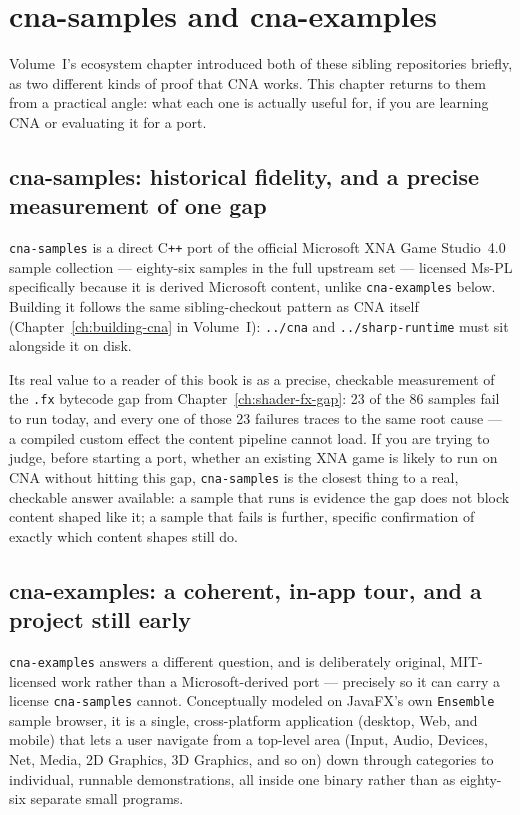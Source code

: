 \chapter{cna-samples and cna-examples}
\label{ch:samples-and-examples}

Volume~I's ecosystem chapter introduced both of these sibling repositories briefly, as two
different kinds of proof that CNA works. This chapter returns to them from a practical
angle: what each one is actually useful for, if you are learning CNA or evaluating it for a
port.

\section{cna-samples: historical fidelity, and a precise measurement of one gap}

\texttt{cna-samples} is a direct C\texttt{++} port of the official Microsoft XNA Game
Studio~4.0 sample collection --- eighty-six samples in the full upstream set --- licensed
Ms-PL specifically because it is derived Microsoft content, unlike \texttt{cna-examples}
below. Building it follows the same sibling-checkout pattern as CNA itself
(Chapter~\ref{ch:building-cna} in Volume~I): \texttt{../cna} and \texttt{../sharp-runtime}
must sit alongside it on disk.

Its real value to a reader of this book is as a precise, checkable measurement of the
\texttt{.fx} bytecode gap from Chapter~\ref{ch:shader-fx-gap}: 23 of the 86 samples fail to
run today, and every one of those 23 failures traces to the same root cause --- a compiled
custom effect the content pipeline cannot load. If you are trying to judge, before starting a
port, whether an existing XNA game is likely to run on CNA without hitting this gap,
\texttt{cna-samples} is the closest thing to a real, checkable answer available: a sample
that runs is evidence the gap does not block content shaped like it; a sample that fails is
further, specific confirmation of exactly which content shapes still do.

\section{cna-examples: a coherent, in-app tour, and a project still early}

\texttt{cna-examples} answers a different question, and is deliberately original,
MIT-licensed work rather than a Microsoft-derived port --- precisely so it can carry a
license \texttt{cna-samples} cannot. Conceptually modeled on JavaFX's own \texttt{Ensemble}
sample browser, it is a single, cross-platform application (desktop, Web, and mobile) that
lets a user navigate from a top-level area (Input, Audio, Devices, Net, Media, 2D Graphics,
3D Graphics, and so on) down through categories to individual, runnable demonstrations, all
inside one binary rather than as eighty-six separate small programs.

